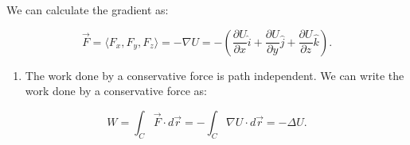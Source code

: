 \documentclass[11pt]{article}
\providecommand{\tightlist}{%
      \setlength{\itemsep}{0pt}\setlength{\parskip}{0pt}}
\begin{document}
We can calculate the gradient as:

\[\vec{F} = \langle F_x, F_y, F_z \rangle = -\nabla U = -\left(\dfrac{\partial U}{\partial x}\hat{i} + \dfrac{\partial U}{\partial y}\hat{j} + \dfrac{\partial U}{\partial z}\hat{k}\right).\]

\begin{enumerate}
\def\labelenumi{\arabic{enumi}.}
\setcounter{enumi}{3}
\tightlist
\item
  The work done by a conservative force is path independent. We can
  write the work done by a conservative force as:
\end{enumerate}

\[W = \int_{C} \vec{F}\cdot d\vec{r} = -\int_{C} \nabla U\cdot d\vec{r} = -\Delta U.\]

    


    
    
    
\end{document}
